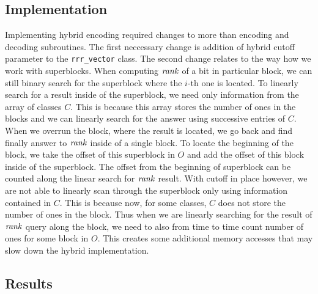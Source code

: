 \subsection{Implementation}

Implementing hybrid encoding required changes to more than encoding and decoding
subroutines. The first neccessary change is addition of hybrid cutoff parameter
to the \texttt{rrr\_vector} class. The second change relates to the way how we work
with superblocks. When computing $\mathit{rank}$ of a bit in particular block, we can still binary
search for the superblock where the $i$-th one is located. To linearly search for a result
inside of the superblock, we need only information from the array of classes $C$.
This is because this array stores the number of ones in the blocks and we can linearly
search for the answer using successive entries of $C$. When we overrun the block, where
the result is located, we go back and find finally answer to $\mathit{rank}$ inside of a
single block. To locate the beginning of the block, we take the offset of this superblock
in $O$ and add the offset of this block inside of the superblock. The offset from the
beginning of superblock can be counted along the linear search for $\mathit{rank}$ result.
With cutoff in place however, we are not able to linearly scan through the superblock
only using information contained in $C$. This is because now, for some classes, $C$ does
not store the number of ones in the block. Thus when we are linearly searching for the result
of $\mathit{rank}$ query along the block, we need to also from time to time count number of ones
for some block in $O$. This creates some additional memory accesses that may slow down the
hybrid implementation.

\subsection{Results}